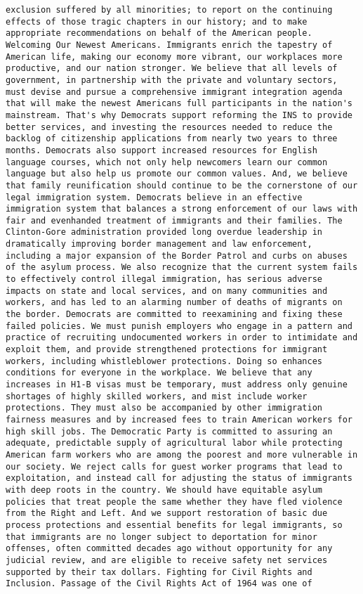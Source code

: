 \documentclass[
]{article}
\begin{document}
\begin{verbatim}
exclusion suffered by all minorities; to report on the continuing effects of those tragic chapters in our history; and to make appropriate recommendations on behalf of the American people. Welcoming Our Newest Americans. Immigrants enrich the tapestry of American life, making our economy more vibrant, our workplaces more productive, and our nation stronger. We believe that all levels of government, in partnership with the private and voluntary sectors, must devise and pursue a comprehensive immigrant integration agenda that will make the newest Americans full participants in the nation's mainstream. That's why Democrats support reforming the INS to provide better services, and investing the resources needed to reduce the backlog of citizenship applications from nearly two years to three months. Democrats also support increased resources for English language courses, which not only help newcomers learn our common language but also help us promote our common values. And, we believe that family reunification should continue to be the cornerstone of our legal immigration system. Democrats believe in an effective immigration system that balances a strong enforcement of our laws with fair and evenhanded treatment of immigrants and their families. The Clinton-Gore administration provided long overdue leadership in dramatically improving border management and law enforcement, including a major expansion of the Border Patrol and curbs on abuses of the asylum process. We also recognize that the current system fails to effectively control illegal immigration, has serious adverse impacts on state and local services, and on many communities and workers, and has led to an alarming number of deaths of migrants on the border. Democrats are committed to reexamining and fixing these failed policies. We must punish employers who engage in a pattern and practice of recruiting undocumented workers in order to intimidate and exploit them, and provide strengthened protections for immigrant workers, including whistleblower protections. Doing so enhances conditions for everyone in the workplace. We believe that any increases in H1-B visas must be temporary, must address only genuine shortages of highly skilled workers, and mist include worker protections. They must also be accompanied by other immigration fairness measures and by increased fees to train American workers for high skill jobs. The Democratic Party is committed to assuring an adequate, predictable supply of agricultural labor while protecting American farm workers who are among the poorest and more vulnerable in our society. We reject calls for guest worker programs that lead to exploitation, and instead call for adjusting the status of immigrants with deep roots in the country. We should have equitable asylum policies that treat people the same whether they have fled violence from the Right and Left. And we support restoration of basic due process protections and essential benefits for legal immigrants, so that immigrants are no longer subject to deportation for minor offenses, often committed decades ago without opportunity for any judicial review, and are eligible to receive safety net services supported by their tax dollars. Fighting for Civil Rights and Inclusion. Passage of the Civil Rights Act of 1964 was one of 
\end{verbatim}
\end{document}
